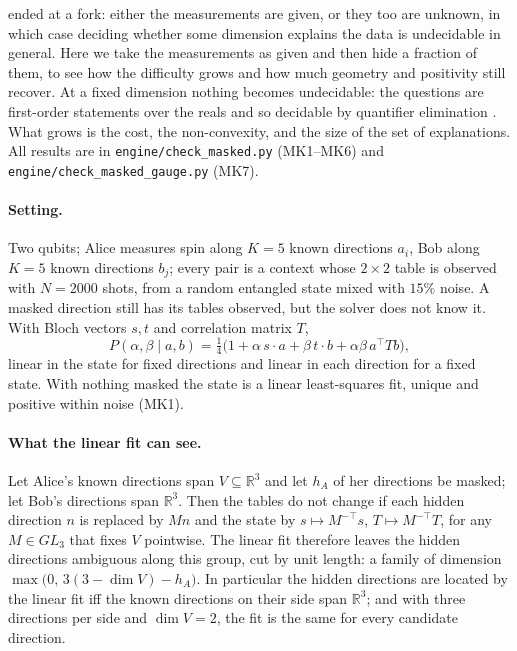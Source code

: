 \documentclass[11pt]{article}
\theoremstyle{definition}\newtheorem{definition}[theorem]{Definition}\newtheorem{remark}[theorem]{Remark}\newtheorem{example}[theorem]{Example}
\newcommand{\R}{\mathbb R}
\begin{document}
 ended at a fork: either the measurements are given, or they too are unknown, in which case deciding whether some
dimension explains the data is undecidable in general. Here we take the measurements as given and then hide a fraction of them, to see how
the difficulty grows and how much geometry and positivity still recover. At a fixed dimension nothing becomes undecidable: the questions
are first-order statements over the reals and so decidable by quantifier elimination \cite{BasuPollackRoy2006}. What grows is the cost,
the non-convexity, and the size of the set of explanations. All results are in \texttt{engine/check\_masked.py} (MK1--MK6) and
\texttt{engine/check\_masked\_gauge.py} (MK7).

\paragraph{Setting.}
Two qubits; Alice measures spin along $K=5$ known directions $a_i$, Bob along $K=5$ known directions $b_j$; every pair is a context whose
$2\times2$ table is observed with $N=2000$ shots, from a random entangled state mixed with $15\%$ noise. A masked direction still has its
tables observed, but the solver does not know it. With Bloch vectors $s,t$ and correlation matrix $T$,
\[
  P(\alpha,\beta\mid a,b)=\tfrac14\big(1+\alpha\,s\cdot a+\beta\,t\cdot b+\alpha\beta\,a^{\!\top}Tb\big),
\]
linear in the state for fixed directions and linear in each direction for a fixed state. With nothing masked the state is a linear
least-squares fit, unique and positive within noise (MK1).

\paragraph{What the linear fit can see.}
\begin{proposition}[MK5, MK7]\label{prop:linmask}
Let Alice's known directions span $V\subseteq\R^3$ and let $h_A$ of her directions be masked; let Bob's directions span $\R^3$. Then the
tables do not change if each hidden direction $n$ is replaced by $Mn$ and the state by $s\mapsto M^{-\top}s$, $T\mapsto M^{-\top}T$, for any
$M\in GL_3$ that fixes $V$ pointwise. The linear fit therefore leaves the hidden directions ambiguous along this group, cut by unit length:
a family of dimension $\max\big(0,\,3(3-\dim V)-h_A\big)$. In particular the hidden directions are located by the linear fit iff the known
directions on their side span $\R^3$; and with three directions per side and $\dim V=2$, the fit is the same for every candidate direction.
\end{proposition}
\end{document}
